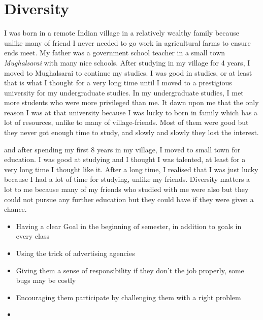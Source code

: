 \documentclass[a4paper]{article}
\begin{document}
\section{Diversity}
I was born in a remote Indian village in a relatively wealthy family 
because unlike many of friend I never needed to go work in
agricultural farms to ensure ends meet. My father was 
a government school teacher in a small town \textit {Mughalsarai} with many nice 
schools. After studying in my village for 4 years, I moved 
to Mughalsarai to continue my studies. I was good in studies, or at least 
that is what I thought for a very long time until I moved to a prestigious university for 
my undergraduate studies. In my undergraduate studies, I met more students who 
were more privileged than me. It dawn upon me that the only reason 
I was at that university because I was lucky to born in family which 
has a lot of resources, unlike to many of village-friends. Most of 
them were good but they never got enough time to study, and 
slowly and slowly they lost the interest.




and after spending my first 8 years 
in my village, I moved to small town for education. 
I was good 
at studying and I thought I was talented, at least for a very long time I thought like it.
After a long time, I realised that I was just lucky because I had a lot of time 
for studying, unlike my friends. Diversity matters a lot to me 
because many of my friends who studied with me were also but they 
could not pursue any further education but they could have 
if they were given a chance. 

\begin{itemize}
  \item Having a clear Goal in the beginning of semester, in addition 
   to goals in every class
  \item Using the trick of advertising agencies
  \item Giving them a sense of responsibility if they don't the job properly, 
    some bugs may be costly 
  \item Encouraging them participate by challenging them with a right problem 
  \item 
\end{itemize}

 
\cite{10.1007/978-3-030-00419-4_4}


\end{document}
